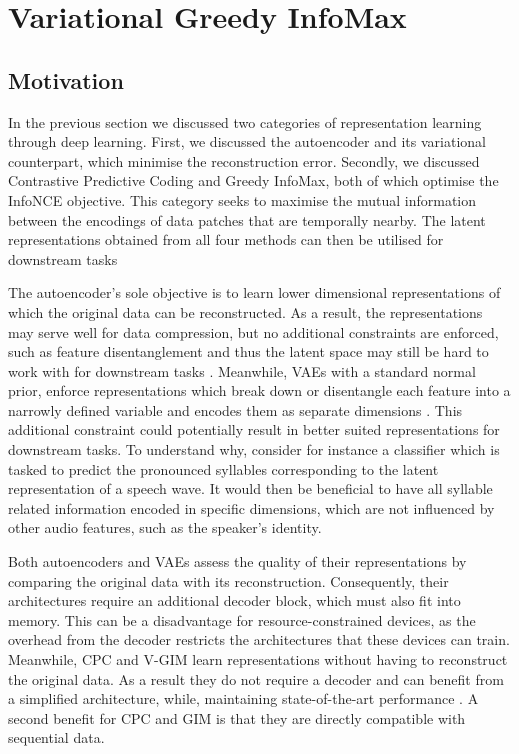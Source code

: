 \chapter{Variational Greedy InfoMax}

\section{Motivation} %
	In the previous section we discussed two categories of representation learning through deep learning. First, we discussed the autoencoder and its variational counterpart, which minimise the reconstruction error. Secondly, we discussed Contrastive Predictive Coding and Greedy InfoMax, both of which optimise the InfoNCE objective. This category seeks to maximise the mutual information between the encodings of data patches that are temporally nearby. The latent representations obtained from all four methods can then be utilised for downstream tasks \citep{bengioRepresentationLearningReview2013, weiRecentAdvancesVariational2021, oordRepresentationLearningContrastive2019, lowePuttingEndEndtoEnd2020}
	
		The autoencoder's sole objective is to learn lower dimensional representations of which the original data can be reconstructed. As a result, the representations may serve well for data compression, but no additional constraints are enforced, such as feature disentanglement and thus the latent space may still be hard to work with for downstream tasks \citep{tschannenRecentAdvancesAutoencoderBased2018}. Meanwhile, VAEs with a standard normal prior, enforce representations which break down or disentangle each feature into a narrowly defined variable and encodes them as separate dimensions \citep{weiRecentAdvancesVariational2021}. This additional constraint could potentially result in better suited representations for downstream tasks. To understand why, consider for instance a classifier which is tasked to predict the pronounced syllables corresponding to the latent representation of a speech wave. It would then be beneficial to have all syllable related information encoded in specific dimensions, which are not influenced by other audio features, such as the speaker's identity.
	

		Both autoencoders and VAEs assess the quality of their representations by comparing the original data with its reconstruction. Consequently, their architectures require an additional decoder block, which must also fit into memory. This can be a disadvantage for resource-constrained devices, as the overhead from the decoder restricts the architectures that these devices can train. Meanwhile, CPC and V-GIM learn representations without having to reconstruct the original data. As a result they do not require a decoder and can benefit from a simplified architecture, while, maintaining state-of-the-art performance \citep{stackeEvaluationContrastivePredictive2020}. A second benefit for CPC and GIM is that they are directly compatible with sequential data.
		
